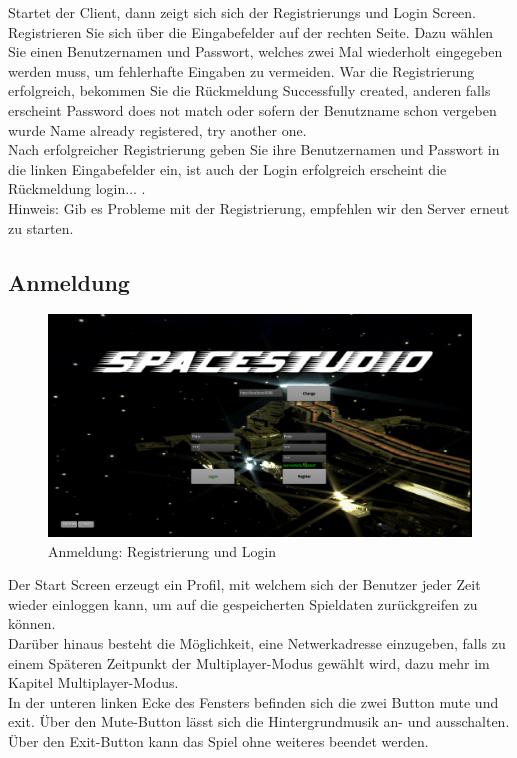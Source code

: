 \documentclass[fontsize=12pt,paper=a4,twoside]{scrartcl}
\begin{document}
Startet der Client, dann zeigt sich sich der Registrierungs und Login Screen.
Registrieren Sie sich über die Eingabefelder auf der rechten Seite. Dazu wählen Sie einen Benutzernamen und Passwort, welches zwei Mal wiederholt eingegeben werden muss, um fehlerhafte Eingaben zu vermeiden.
War die Registrierung erfolgreich, bekommen Sie die Rückmeldung Successfully created, anderen falls erscheint Password does not match oder sofern der Benutzname schon vergeben wurde Name already
registered, try another one.\\
Nach erfolgreicher Registrierung geben Sie ihre Benutzernamen und Passwort in die linken Eingabefelder ein, ist auch der Login erfolgreich erscheint die Rückmeldung login... .\\

Hinweis: Gib es Probleme mit der Registrierung, empfehlen wir den Server erneut zu starten.

\subsection{Anmeldung}
\begin{figure}[htp]
\centering
	\includegraphics[width=1.00\linewidth]{pics/StartScreen01.png}
	\caption{Anmeldung: Registrierung und Login}
	\label{fig1}
\end{figure}

Der Start Screen erzeugt ein Profil, mit welchem sich der Benutzer jeder Zeit wieder einloggen kann, um auf die gespeicherten Spieldaten zurückgreifen zu können. \\
Darüber hinaus besteht die Möglichkeit, eine Netwerkadresse einzugeben, falls zu einem Späteren Zeitpunkt der Multiplayer-Modus gewählt wird, dazu mehr im Kapitel Multiplayer-Modus.\\
In der unteren linken Ecke des Fensters befinden sich die zwei Button mute und exit. Über den Mute-Button lässt sich die Hintergrundmusik an- und ausschalten. 
Über den Exit-Button kann das Spiel ohne weiteres beendet werden.
\end{document}
